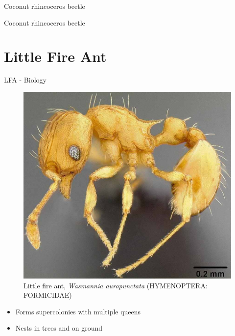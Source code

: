 \documentclass[]{beamer}
\begin{document}
\begin{frame}{Coconut rhincoceros beetle}
\end{frame}

\begin{frame}{Coconut rhincoceros beetle}
\end{frame}

\section{Little Fire Ant}

\begin{frame}{LFA - Biology}
	\begin{figure}
	\includegraphics[height=0.6\textheight]{lfa.jpg}
	\caption{Little fire ant, \textit{Wasmannia auropunctata} (HYMENOPTERA: FORMICIDAE)}
	\end{figure}
	\begin{itemize}
		\item Forms supercolonies with multiple queens
		\item Nests in trees and on ground
	\end{itemize}
\end{frame}
\end{document}

